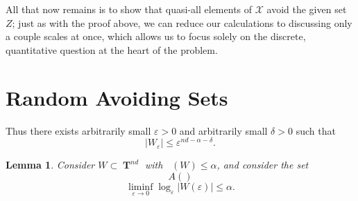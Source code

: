 \documentclass[12pt,reqno]{article}
\numberwithin{equation}{section}
\DeclareMathOperator{\lowminkdim}{\underline{\dim}_{\mathbf{M}}}
\DeclareMathOperator{\TT}{\mathbf{T}}
\newtheorem{lemma}[theorem]{Lemma}
\begin{document}
All that now remains is to show that quasi-all elements of $\mathcal{X}$ avoid the given set $Z$; just as with the proof above, we can reduce our calculations to discussing only a couple scales at once, which allows us to focus solely on the discrete, quantitative question at the heart of the problem.

\section{Random Avoiding Sets}


%
Thus there exists arbitrarily small $\varepsilon > 0$ and arbitrarily small $\delta > 0$ such that
%
\[ |W_\varepsilon| \leq \varepsilon^{nd - \alpha - \delta}. \]


\begin{lemma}
    Consider $W \subset \TT^{nd}$ with $\lowminkdim(W) \leq \alpha$, and consider the set
    \[ A() \]
    \[ \liminf_{\varepsilon \to 0} \log_\varepsilon |W(\varepsilon)| \leq \alpha. \]
\end{lemma}
\end{document}
